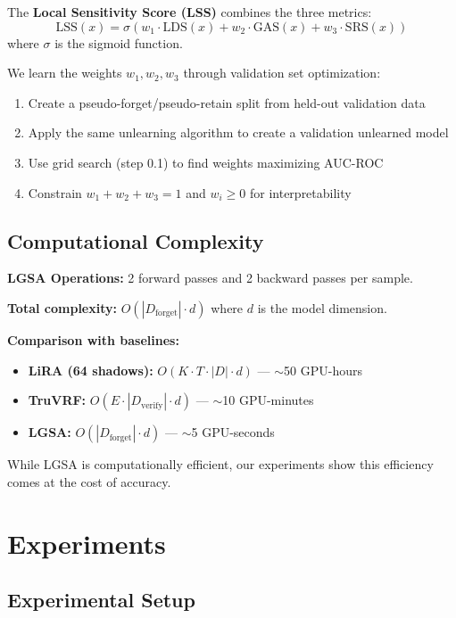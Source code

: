 \documentclass{article}
\begin{document}
The \textbf{Local Sensitivity Score (LSS)} combines the three metrics:
\begin{equation}
\text{LSS}(x) = \sigma(w_1 \cdot \text{LDS}(x) + w_2 \cdot \text{GAS}(x) + w_3 \cdot \text{SRS}(x))
\end{equation}
where $\sigma$ is the sigmoid function.

We learn the weights $w_1, w_2, w_3$ through validation set optimization:
\begin{enumerate}
    \item Create a pseudo-forget/pseudo-retain split from held-out validation data
    \item Apply the same unlearning algorithm to create a validation unlearned model
    \item Use grid search (step 0.1) to find weights maximizing AUC-ROC
    \item Constrain $w_1 + w_2 + w_3 = 1$ and $w_i \geq 0$ for interpretability
\end{enumerate}

\subsection{Computational Complexity}

\textbf{LGSA Operations:} 2 forward passes and 2 backward passes per sample.

\textbf{Total complexity:} $O(|D_{\text{forget}}| \cdot d)$ where $d$ is the model dimension.

\textbf{Comparison with baselines:}
\begin{itemize}
    \item \textbf{LiRA (64 shadows):} $O(K \cdot T \cdot |D| \cdot d)$ --- $\sim$50 GPU-hours
    \item \textbf{TruVRF:} $O(E \cdot |D_{\text{verify}}| \cdot d)$ --- $\sim$10 GPU-minutes
    \item \textbf{LGSA:} $O(|D_{\text{forget}}| \cdot d)$ --- $\sim$5 GPU-seconds
\end{itemize}

While LGSA is computationally efficient, our experiments show this efficiency comes at the cost of accuracy.

\section{Experiments}
\label{sec:experiments}

\subsection{Experimental Setup}
\end{document}
